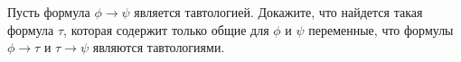Пусть формула $\phi \to \psi$ является тавтологией. Докажите, что найдется такая формула $\tau$, которая содержит только
общие для $\phi$ и $\psi$ переменные, что формулы $\phi \to \tau$ и $\tau \to \psi$ являются тавтологиями.